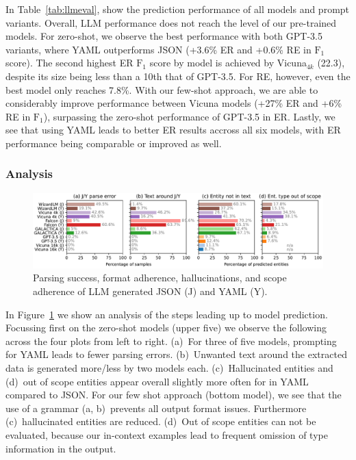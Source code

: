 In Table~\ref{tab:llmeval}, show the prediction performance of all models and prompt variants. Overall, LLM performance does not reach the level of our pre-trained models. For zero-shot, we observe the best performance with both GPT-3.5 variants, where YAML outperforms JSON (+3.6\% ER and +0.6\% RE in $\text{F}_1$ score). The second highest ER $\text{F}_1$ score by model is achieved by Vicuna${}_{4k}$ (22.3), despite its size being less than a 10th that of GPT-3.5. For RE, however, even the best model only reaches 7.8\%. With our few-shot approach, we are able to considerably improve performance between Vicuna models (+27\% ER and +6\% RE in $\text{F}_1$), surpassing the zero-shot performance of GPT-3.5 in ER.
Lastly, we see that using YAML leads to better ER results accross all six models, with ER performance being comparable or improved as well.

\subsubsection{Analysis}


\begin{figure}[tb]
  \centering
  \includegraphics[width=\linewidth]{figures/ref_params/format_eval_mix}
  \caption[Parsing success, format adherence, hallucinations, and scope adherence of LLM generated JSON and YAML]{Parsing success, format adherence, hallucinations, and scope adherence of LLM generated JSON (J) and YAML (Y).}
  \label{fig:yamlVSjson}
\end{figure}

In Figure~\ref{fig:yamlVSjson} we show an analysis of the steps leading up to model prediction. Focussing first on the zero-shot models (upper five) we observe the following across the four plots from left to right. (a)~For three of five models, prompting for YAML leads to fewer parsing errors. (b)~Unwanted text around the extracted data is generated more/less by two models each. (c)~Hallucinated entities and (d)~out of scope entities appear overall slightly more often for in YAML compared to JSON. For our few shot approach (bottom model), we see that the use of a grammar (a, b)~prevents all output format issues. Furthermore (c)~hallucinated entities are reduced. (d)~Out of scope entities can not be evaluated, because our in-context examples lead to frequent omission of type information in the output.

